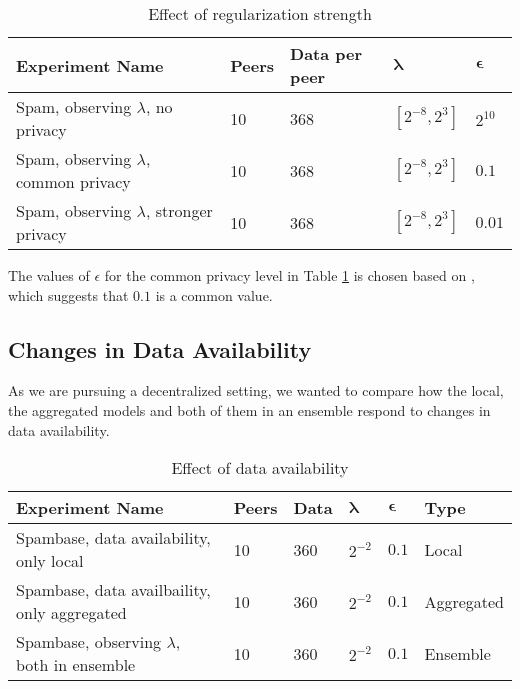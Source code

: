 \begin{table}[h]
	\centering
	\caption{Effect of regularization strength}
	\label{tab:experiments_regularization_strength}
	\begin{tabular}{|l|l|l|l|l|}
		\textbf{Experiment Name}    & \textbf{Peers} & \textbf{Data per peer} & $\boldsymbol{\lambda}$         & $\boldsymbol{\epsilon}$ \\
		\hline
		Spam, observing $\lambda$, no privacy       & 10    & 368  & $[2^{-8}, 2^{3}]$ & $2^{10}$   \\
		Spam, observing $\lambda$, common privacy   & 10    & 368  & $[2^{-8}, 2^{3}]$ & $0.1$      \\
		Spam, observing $\lambda$, stronger privacy & 10    & 368  & $[2^{-8}, 2^{3}]$ & $0.01$    
	\end{tabular}
\end{table}

The values of $\epsilon$ for the  common privacy level in Table \ref{tab:experiments_regularization_strength} is chosen based on \cite{dwork2008differential}, which suggests that $0.1$ is a common value.

\subsection{Changes in Data Availability}

As we are pursuing a decentralized setting, we wanted to compare how the local, the aggregated models and both of them in an ensemble respond to changes in data availability.

\begin{table}[h]
	\centering
	\caption{Effect of data availability}
	\label{tab:experiments_data_availability}
	\begin{tabular}{|l|l|l|l|l|l|}
		\textbf{Experiment Name}                                 & \textbf{Peers} & \textbf{Data} & $\boldsymbol{\lambda}$ & $\boldsymbol{\epsilon}$ & \textbf{Type}       \\
		\hline
		Spambase, data availability, only local         & 10    & 360  & $2^{-2}$  & $0.1$      & Local      \\
		Spambase, data availbaility, only aggregated    & 10    & 360  & $2^{-2}$  & $0.1$      & Aggregated \\
		Spambase, observing $\lambda$, both in ensemble & 10    & 360  & $2^{-2}$  & $0.1$      & Ensemble  
	\end{tabular}
\end{table}

